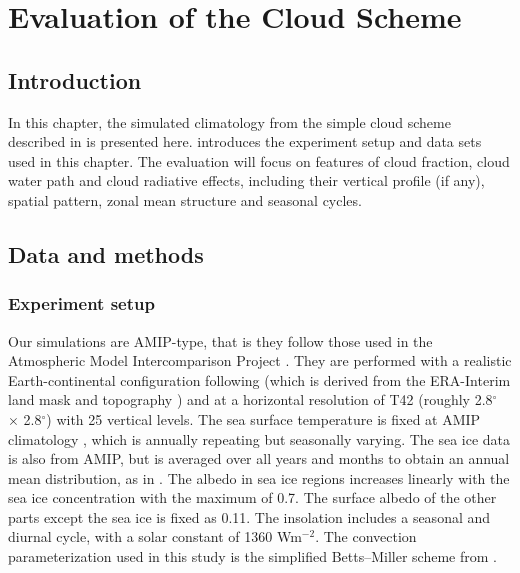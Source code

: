 \chapter{Evaluation of the Cloud Scheme}
\label{ch:eval_cld_scheme}

\section{Introduction}

In this chapter, the simulated climatology from the simple cloud scheme described in  is presented here.  introduces the experiment setup and data sets used in this chapter. The evaluation will focus on features of cloud fraction, cloud water path and cloud radiative effects, including their vertical profile (if any), spatial pattern, zonal mean structure and seasonal cycles.

\section{Data and methods}
\label{sec:exp_setup_and_dataset}

\subsection{Experiment setup}
\label{sec:eval_cld_exp_setup}

Our simulations are AMIP-type, that is they follow those used in the Atmospheric Model Intercomparison Project . They are performed with a realistic Earth-continental configuration following \citet{Thomson2018} (which is derived from the ERA-Interim land mask and topography \citep{Dee2011}) and at a horizontal resolution of T42 (roughly 2.8$^\circ$ $\times$ 2.8$^\circ$) with 25 vertical levels. The sea surface temperature is fixed at AMIP climatology \citep{Taylor2000sea}, which is annually repeating but seasonally varying. The sea ice data is also from AMIP, but is averaged over all years and months to obtain an annual mean distribution, as in \citet{Thomson2018}. The albedo in sea ice regions increases linearly with the sea ice concentration with the maximum of 0.7. The surface albedo of the other parts except the sea ice is fixed as 0.11. The insolation includes a seasonal and diurnal cycle, with a solar constant  of 1360 Wm$^{-2}$. The convection parameterization used in this study is the simplified Betts--Miller scheme from \citet{Frierson2007}. 

